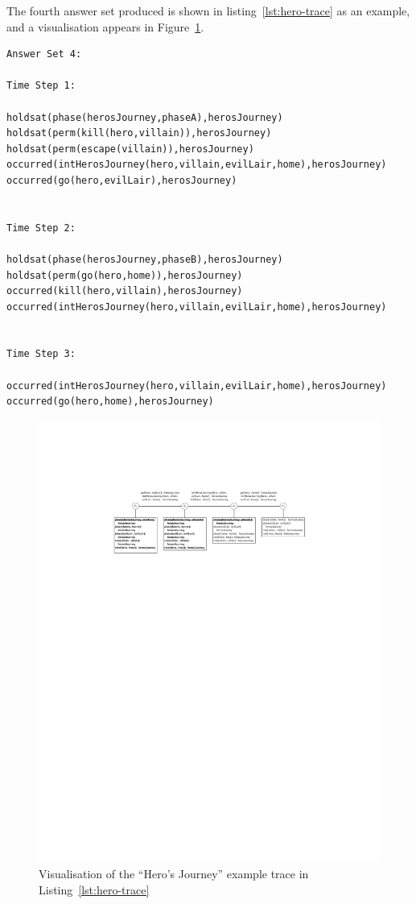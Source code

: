 \documentclass[11pt]{report}
\begin{document}
The fourth answer set produced is shown in
listing~\ref{lst:hero-trace} as an example, and a visualisation appears in Figure~\ref{fig:hero-trace}.

\begin{lstlisting}[label={lst:hero-trace},caption={Example trace for the
``Hero's Journey'' trope}]
Answer Set 4:

Time Step 1:

holdsat(phase(herosJourney,phaseA),herosJourney)
holdsat(perm(kill(hero,villain)),herosJourney)
holdsat(perm(escape(villain)),herosJourney)
occurred(intHerosJourney(hero,villain,evilLair,home),herosJourney)
occurred(go(hero,evilLair),herosJourney)


Time Step 2:

holdsat(phase(herosJourney,phaseB),herosJourney)
holdsat(perm(go(hero,home)),herosJourney)
occurred(kill(hero,villain),herosJourney)
occurred(intHerosJourney(hero,villain,evilLair,home),herosJourney)


Time Step 3:

occurred(intHerosJourney(hero,villain,evilLair,home),herosJourney)
occurred(go(hero,home),herosJourney)
\end{lstlisting}


\begin{figure}[!t]
\centerline{\includegraphics[width=\textwidth]{herosJourney4-crop.pdf}}
\caption{Visualisation of the ``Hero's Journey'' example trace in Listing~\ref{lst:hero-trace}}\label{fig:hero-trace}
\end{figure}
\end{document}
